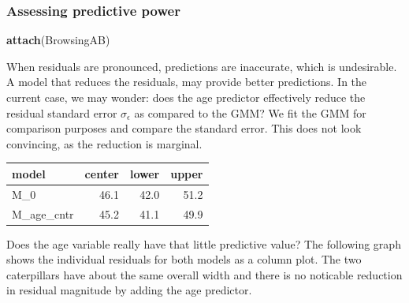 \documentclass[]{svmono}
\newenvironment{Shaded}{\begin{snugshade}}{\end{snugshade}}
\newcommand{\KeywordTok}[1]{\textcolor[rgb]{0.13,0.29,0.53}{\textbf{#1}}}
\newcommand{\DataTypeTok}[1]{\textcolor[rgb]{0.13,0.29,0.53}{#1}}
\newcommand{\DecValTok}[1]{\textcolor[rgb]{0.00,0.00,0.81}{#1}}
\newcommand{\StringTok}[1]{\textcolor[rgb]{0.31,0.60,0.02}{#1}}
\newcommand{\OperatorTok}[1]{\textcolor[rgb]{0.81,0.36,0.00}{\textbf{#1}}}
\newcommand{\NormalTok}[1]{#1}
\begin{document}
\subsubsection{Assessing predictive power}\label{resid_predictive_power}

\begin{Shaded}
\begin{Highlighting}[]
\KeywordTok{attach}\NormalTok{(BrowsingAB)}
\end{Highlighting}
\end{Shaded}

When residuals are pronounced, predictions are inaccurate, which is
undesirable. A model that reduces the residuals, may provide better
predictions. In the current case, we may wonder: does the age predictor
effectively reduce the residual standard error \(\sigma_\epsilon\) as
compared to the GMM? We fit the GMM for comparison purposes and compare
the standard error. This does not look convincing, as the reduction is
marginal.

\begin{Shaded}
\end{Shaded}

\begin{Shaded}
\end{Shaded}

\begin{longtable}[]{@{}lrrr@{}}
\toprule
model & center & lower & upper\tabularnewline
\midrule
\endhead
M\_0 & 46.1 & 42.0 & 51.2\tabularnewline
M\_age\_cntr & 45.2 & 41.1 & 49.9\tabularnewline
\bottomrule
\end{longtable}

Does the age variable really have that little predictive value? The
following graph shows the individual residuals for both models as a
column plot. The two caterpillars have about the same overall width and
there is no noticable reduction in residual magnitude by adding the age
predictor.
\end{document}
